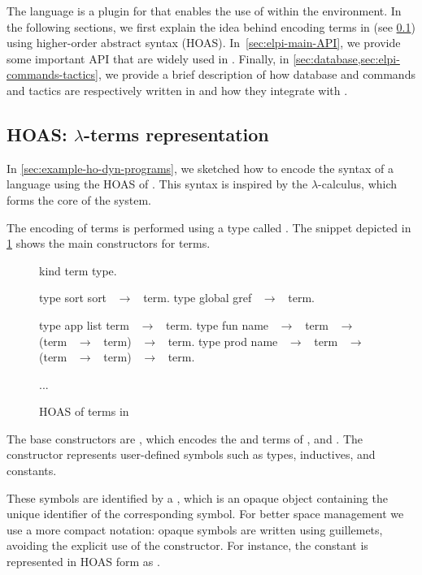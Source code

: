The \rocqelpi language is a plugin for \rocq that enables the use of \elpi
within the \rocq environment. In the following sections, we first explain the
idea behind encoding \rocq terms in \elpi (see \cref{sec:hoas}) using
higher-order abstract syntax (HOAS).
In~\cref{sec:elpi-main-API}, we provide some important API that are widely used
in \rocqelpi. Finally, in \cref{sec:database,sec:elpi-commands-tactics}, we provide
a brief
description of how database and commands and tactics are respectively written in \rocqelpi and how they
integrate with \rocq.

\subsection{HOAS: \texorpdfstring{$\lambda$}{lambda}-terms representation}
\label{sec:hoas}

In \cref{sec:example-ho-dyn-programs}, we sketched how to encode the syntax of a
language using the HOAS of \elpi. This syntax is inspired by the
$\lambda$-calculus, which forms the core of the \rocq system. 

The encoding of \rocq terms is performed using a \elpi type called
. The snippet depicted in \cref{fig:hoas} shows the main constructors
for terms.

\begin{figure}  
\begin{elpicode}
kind term type.

type sort    sort ~$\to$~ term.                 %
type global  gref ~$\to$~ term.

type app     list term ~$\to$~ term.            %
type fun     name ~$\to$~ term ~$\to$~ (term ~$\to$~ term) ~$\to$~ term. 
type prod    name ~$\to$~ term ~$\to$~ (term ~$\to$~ term) ~$\to$~ term. 

...                     %
\end{elpicode}
\vspace{-1.5em}
\caption{HOAS of \rocq terms in \elpi}
\label{fig:hoas}
\end{figure}

The base constructors are , which encodes the  and 
terms of \rocq, and . The  constructor represents
user-defined symbols such as types, inductives, and constants. 

These symbols are identified by a , which is an opaque object
containing the unique identifier of the corresponding \rocq symbol. For better
space management we use a more compact notation: opaque \rocq{} symbols are
written using guillemets, avoiding the explicit use of the 
constructor. For instance, the \rocq{} constant  is represented in HOAS
form as .

